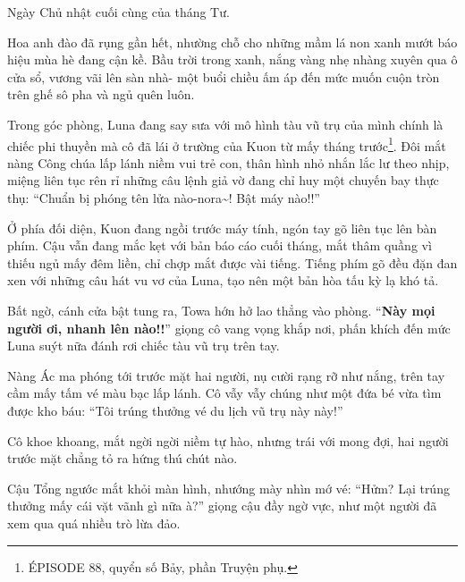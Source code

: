 \documentclass[../main.tex]{subfiles}
\begin{document}

Ngày Chủ nhật cuối cùng của tháng Tư.

Hoa anh đào đã rụng gần hết, nhường chỗ cho những mầm lá non xanh mướt báo hiệu mùa hè đang cận kề. Bầu trời trong xanh, nắng vàng nhẹ nhàng xuyên qua ô cửa sổ, vương vãi lên sàn nhà- một buổi chiều ấm áp đến mức muốn cuộn tròn trên ghế sô pha và ngủ quên luôn.

Trong góc phòng, Luna đang say sưa với mô hình tàu vũ trụ của mình chính là chiếc phi thuyền mà cô đã lái ở trường của Kuon từ mấy tháng trước\footnote{{\flaregothic ÉPISODE 88}, quyển số Bảy, phần {\abv Truyện phụ}.}. Đôi mắt nàng Công chúa lấp lánh niềm vui trẻ con, thân hình nhỏ nhắn lắc lư theo nhịp, miệng liên tục rên rỉ những câu lệnh giả vờ đang chỉ huy một chuyến bay thực thụ: ``Chuẩn bị phóng tên lửa nào-nora\~{}! Bật máy nào!!''


Ở phía đối diện, Kuon đang ngồi trước máy tính, ngón tay gõ liên tục lên bàn phím. Cậu vẫn đang mắc kẹt với bản báo cáo cuối tháng, mắt thâm quầng vì thiếu ngủ mấy đêm liền, chỉ chợp mắt được vài tiếng. Tiếng phím gõ đều đặn đan xen với những câu hát vu vơ của Luna, tạo nên một bản hòa tấu kỳ lạ khó tả.

Bất ngờ, cánh cửa bật tung ra, Towa hớn hở lao thẳng vào phòng. ``\textbf{Này mọi người ơi, nhanh lên nào!!}'' giọng cô vang vọng khắp nơi, phấn khích đến mức Luna suýt nữa đánh rơi chiếc tàu vũ trụ trên tay.

Nàng Ác ma phóng tới trước mặt hai người, nụ cười rạng rỡ như nắng, trên tay cầm mấy tấm vé màu bạc lấp lánh. Cô vẫy vẫy chúng như một đứa bé vừa tìm được kho báu: ``Tôi trúng thưởng vé du lịch vũ trụ này này!''


Cô khoe khoang, mắt ngời ngời niềm tự hào, nhưng trái với mong đợi, hai người trước mặt chẳng tỏ ra hứng thú chút nào.

Cậu Tổng ngước mắt khỏi màn hình, nhướng mày nhìn mớ vé: ``Hửm? Lại trúng thưởng mấy cái vặt vãnh gì nữa à?'' giọng cậu đầy ngờ vực, như một người đã xem qua quá nhiều trò lừa đảo.
\end{document}
